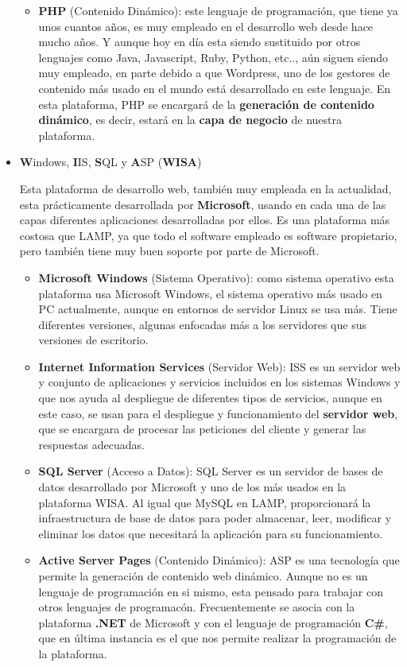 \begin{itemize}
\begin{itemize}
        \item \textbf{PHP} (Contenido Dinámico): este lenguaje de programación, que tiene ya unos cuantos años, es muy empleado en el desarrollo web desde hace mucho años. Y aunque hoy en día esta siendo sustituido por otros lenguajes como Java, Javascript, Ruby, Python, etc.., aún siguen siendo muy empleado, en parte debido a que Wordpress, uno de los gestores de contenido más usado en el mundo está desarrollado en este lenguaje. En esta plataforma, PHP se encargará de la \textbf{generación de contenido dinámico}, es decir, estará en la \textbf{capa de negocio} de nuestra plataforma.
    \end{itemize}

    \item \textbf{W}indows, \textbf{I}IS, \textbf{S}QL y \textbf{A}SP (\textbf{WISA})

    Esta plataforma de desarrollo web, también muy empleada en la actualidad, esta prácticamente desarrollada por \textbf{Microsoft}, usando en cada una de las capas diferentes aplicaciones desarrolladas por ellos. Es una plataforma más costosa que LAMP, ya que todo el software empleado es software propietario, pero también tiene muy buen soporte por parte de Microsoft.

    \begin{itemize}
        \item \textbf{Microsoft Windows} (Sistema Operativo): como sistema operativo esta plataforma usa Microsoft Windows, el sistema operativo más usado en PC actualmente, aunque en entornos de servidor Linux se usa más. Tiene diferentes versiones, algunas enfocadas más a los servidores que sus versiones de escritorio.

        \item \textbf{Internet Information Services} (Servidor Web): ISS es un servidor web y conjunto de aplicaciones y servicios incluidos en los sistemas Windows y que nos ayuda al despliegue de diferentes tipos de servicios, aunque en este caso, se usan para el despliegue y funcionamiento del \textbf{servidor web}, que se encargara de procesar las peticiones del cliente y generar las respuestas adecuadas.

        \item \textbf{SQL Server} (Acceso a Datos): SQL Server es un servidor de bases de datos desarrollado por Microsoft y uno de los más usados en la plataforma WISA. Al igual que MySQL en LAMP, proporcionará la infraestructura de base de datos para poder almacenar, leer, modificar y eliminar los datos que necesitará la aplicación para su funcionamiento.

        \item \textbf{Active Server Pages} (Contenido Dinámico): ASP es una tecnología que permite la generación de contenido web dinámico. Aunque no es un lenguaje de programación en si mismo, esta pensado para trabajar con otros lenguajes de programacón. Frecuentemente se asocia con la plataforma \textbf{.NET} de Microsoft y con el lenguaje de programación \textbf{C\#}, que en última instancia es el que nos permite realizar la programación de la plataforma.
    \end{itemize}
\end{itemize}

